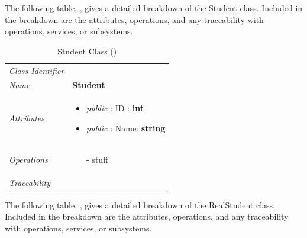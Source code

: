 \documentclass[12pt,letterpaper]{article}
\begin{document}
The following table, , gives a detailed breakdown of the Student class. Included in the breakdown are the attributes, operations, and any traceability with operations, services, or subsystems.

\begin{table}[H]
    \caption{Student Class ()} 
	\begin{tabu} to 
		\toprule
		Class Identifier &  \\
		Name & {\bf Student} \\
		Attributes & 
		\begin{minipage}[t]{\linewidth}
		    \begin{itemize}
		        \item \textit{public} : ID : {\bf int}
		        \item \textit{public} : Name: {\bf string}
			\end{itemize}
	    \end{minipage} \\

		Operations &
		\begin{minipage}[t]{\linewidth}
			\begin{enumerate}
			    \item[-] stuff
	        \end{enumerate}
	    \end{minipage} \\
	    	Traceability & \\
		\toprule
	\end{tabu}
\end{table}

The following table, , gives a detailed breakdown of the RealStudent class. Included in the breakdown are the attributes, operations, and any traceability with operations, services, or subsystems.
\end{document}
